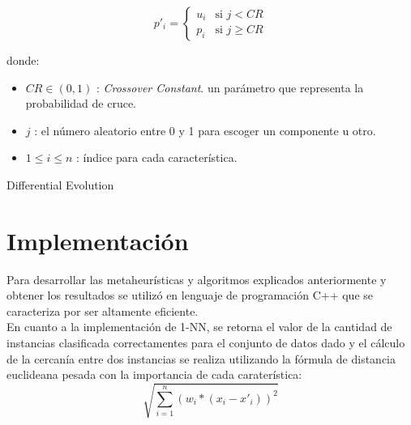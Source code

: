 \documentclass{ci5652}
\begin{document}
\[
p'_i =
  \begin{cases}
    u_i & \text{si } j < CR\\
    p_i & \text{si } j \geq CR
  \end{cases}
\]

donde:
\begin{itemize}
  \item $CR \in (0,1)$ : \textit{Crossover Constant}. un parámetro que
  representa la probabilidad de cruce.
  \item $j$ : el número aleatorio entre 0 y 1 para escoger un componente u otro.
  \item $1 \leq i \leq n $ : índice para cada característica.
\end{itemize}

\begin{algorithm}
 \DontPrintSemicolon
 \vspace*{0.1cm}
 \vspace*{0.1cm}
 \caption{Differential Evolution}
\end{algorithm}


\section{Implementación}

Para desarrollar las metaheurísticas y algoritmos explicados anteriormente y
obtener los resultados se utilizó en lenguaje de programación C++ que se
caracteriza por ser altamente eficiente.\\

En cuanto a la implementación de 1-NN, se retorna el valor de la cantidad de
instancias clasificada correctamentes para el conjunto de datos dado y el
cálculo de la cercanía entre dos instancias se realiza utilizando la fórmula de
distancia euclideana pesada con la importancia de cada caraterística:
$$\sqrt{\sum_{i=1}^n (w_i * (x_i - x'_i))^{2}}$$
\end{document}
